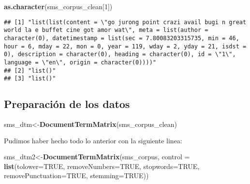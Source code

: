 \documentclass[]{article}
\newenvironment{Shaded}{\begin{snugshade}}{\end{snugshade}}
\newcommand{\KeywordTok}[1]{\textcolor[rgb]{0.13,0.29,0.53}{\textbf{#1}}}
\newcommand{\DataTypeTok}[1]{\textcolor[rgb]{0.13,0.29,0.53}{#1}}
\newcommand{\DecValTok}[1]{\textcolor[rgb]{0.00,0.00,0.81}{#1}}
\newcommand{\OtherTok}[1]{\textcolor[rgb]{0.56,0.35,0.01}{#1}}
\newcommand{\NormalTok}[1]{#1}
\begin{document}
\begin{Shaded}
\begin{Highlighting}[]
\KeywordTok{as.character}\NormalTok{(sms_corpus_clean[}\DecValTok{1}\NormalTok{])}
\end{Highlighting}
\end{Shaded}

\begin{verbatim}
## [1] "list(list(content = \"go jurong point crazi avail bugi n great world la e buffet cine got amor wat\", meta = list(author = character(0), datetimestamp = list(sec = 7.80083203315735, min = 46, hour = 6, mday = 22, mon = 0, year = 119, wday = 2, yday = 21, isdst = 0), description = character(0), heading = character(0), id = \"1\", language = \"en\", origin = character(0))))"
## [2] "list()"                                                                                                                                                                                                                                                                                                                                                                                
## [3] "list()"
\end{verbatim}

\subsection{Preparación de los datos}\label{preparacion-de-los-datos}

\begin{Shaded}
\begin{Highlighting}[]
\NormalTok{sms_dtm<-}\KeywordTok{DocumentTermMatrix}\NormalTok{(sms_corpus_clean)}
\end{Highlighting}
\end{Shaded}

Pudimos haber hecho todo lo anterior con la siguiente linea:

\begin{Shaded}
\begin{Highlighting}[]
\NormalTok{sms_dtm2<-}\KeywordTok{DocumentTermMatrix}\NormalTok{(sms_corpus,}
                             \DataTypeTok{control =} \KeywordTok{list}\NormalTok{(}\DataTypeTok{tolower=}\OtherTok{TRUE}\NormalTok{,}
                                            \DataTypeTok{removeNumbers=}\OtherTok{TRUE}\NormalTok{,}
                                            \DataTypeTok{stopwords=}\OtherTok{TRUE}\NormalTok{,}
                                            \DataTypeTok{removePunctuation=}\OtherTok{TRUE}\NormalTok{,}
                                            \DataTypeTok{stemming=}\OtherTok{TRUE}\NormalTok{))}
\end{Highlighting}
\end{Shaded}
\end{document}
